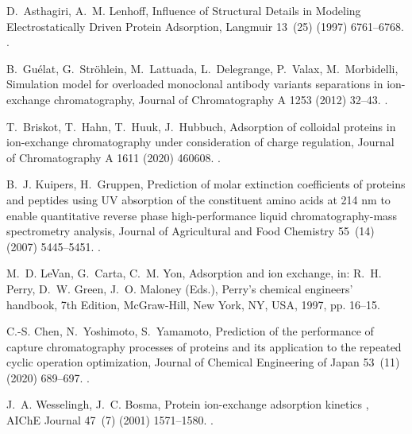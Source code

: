 \documentclass[preprint,review,12pt]{elsarticle}
\providecommand{\DIFaddtex}[1]{{\protect\color{blue} \sf #1}} %
\providecommand{\DIFaddbegin}{} %
\providecommand{\DIFaddend}{} %
\providecommand{\DIFadd}[1]{\texorpdfstring{\DIFaddtex{#1}}{#1}} %
\begin{document}
\begin{thebibliography}{10}
D.~Asthagiri, A.~M. Lenhoff, {Influence of Structural Details in Modeling
  Electrostatically Driven Protein Adsorption}, Langmuir 13~(25) (1997)
  6761--6768.
\newblock \href {https://doi.org/10.1021/la970608u}
  {}.

B.~Gu{\'{e}}lat, G.~Str{\"{o}}hlein, M.~Lattuada, L.~Delegrange, P.~Valax,
  M.~Morbidelli, {Simulation model for overloaded monoclonal antibody variants
  separations in ion-exchange chromatography}, Journal of Chromatography A 1253
  (2012) 32--43.
\newblock \href {https://doi.org/10.1016/j.chroma.2012.06.081}
  {}.

T.~Briskot, T.~Hahn, T.~Huuk, J.~Hubbuch, {Adsorption of colloidal proteins in
  ion-exchange chromatography under consideration of charge regulation},
  Journal of Chromatography A 1611 (2020) 460608.
\newblock \href {https://doi.org/10.1016/j.chroma.2019.460608}
  {}.

B.~J. Kuipers, H.~Gruppen, {Prediction of molar extinction coefficients of
  proteins and peptides using UV absorption of the constituent amino acids at
  214 nm to enable quantitative reverse phase high-performance liquid
  chromatography-mass spectrometry analysis}, Journal of Agricultural and Food
  Chemistry 55~(14) (2007) 5445--5451.
\newblock \href {https://doi.org/10.1021/jf070337l}
  {}.

\DIFaddbegin {}
\DIFadd{M.~D. LeVan, G.~Carta, C.~M. Yon, Adsorption and ion exchange, in: R.~H. Perry,
  D.~W. Green, J.~O. Maloney (Eds.), Perry's chemical engineers' handbook, 7th
  Edition, McGraw-Hill, New York, NY, USA, 1997, pp. 16--15.
}

\DIFaddend {}
C.-S. Chen, N.~Yoshimoto, S.~Yamamoto, {Prediction of the performance of
  capture chromatography processes of proteins and its application to the
  repeated cyclic operation optimization}, Journal of Chemical Engineering of
  Japan 53~(11) (2020) 689--697.
\newblock \href {https://doi.org/10.1252/JCEJ.20WE116}
  {}.

\DIFaddbegin {}
\DIFadd{J.~A. Wesselingh, J.~C. Bosma, }{\DIFadd{Protein ion-exchange adsorption kinetics}}\DIFadd{,
  AIChE Journal 47~(7) (2001) 1571--1580.
}\newblock \href {https://doi.org/10.1002/aic.690470710}
  {}\DIFadd{.
}


\end{thebibliography}
\end{document}
